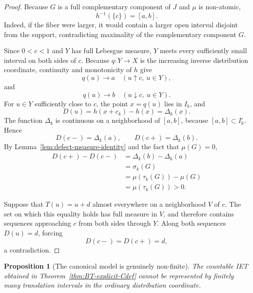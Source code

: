 \documentclass[11pt]{amsart}
\theoremstyle{plain}
\newtheorem{proposition}[theorem]{Proposition}
\theoremstyle{definition}
\theoremstyle{remark}
\begin{document}
\begin{proof}
Because \(G\) is a full complementary component of \(J\) and \(\mu\) is non-atomic,
\[
        h^{-1}(\{c\})=[a,b].
\]
Indeed, if the fiber were larger, it would contain a larger open interval disjoint from the
support, contradicting maximality of the complementary component \(G\).

Since \(0<c<1\) and \(Y\) has full Lebesgue measure, \(Y\) meets every sufficiently small
interval on both sides of \(c\). Because \(q:Y\to X\) is the increasing inverse
distribution coordinate, continuity and monotonicity of \(h\) give
\[
        q(u)\longrightarrow a
        \quad(u\uparrow c,\ u\in Y),
\]
and
\[
        q(u)\longrightarrow b
        \quad(u\downarrow c,\ u\in Y).
\]
For \(u\in Y\) sufficiently close to \(c\), the point \(x=q(u)\) lies in \(I_k\), and
\[
        D(u)=h(x+c_k)-h(x)=\Delta_k(x).
\]
The function \(\Delta_k\) is continuous on a neighborhood of \([a,b]\), because
\([a,b]\subset I_k^\circ\). Hence
\[
        D(c-)=\Delta_k(a),
        \qquad
        D(c+)=\Delta_k(b).
\]
By Lemma~\ref{lem:defect-measure-identity} and the fact that \(\mu(G)=0\),
\[
\begin{aligned}
D(c+)-D(c-)
&=
\Delta_k(b)-\Delta_k(a)\\
&=
\sigma_k(G)\\
&=
\mu(\tau_k(G))-\mu(G)\\
&=
\mu(\tau_k(G))
>0.
\end{aligned}
\]

Suppose that \(T(u)=u+d\) almost everywhere on a neighborhood \(V\) of \(c\). The set on
which this equality holds has full measure in \(V\), and therefore contains sequences
approaching \(c\) from both sides through \(Y\). Along both sequences \(D(u)=d\), forcing
\[
        D(c-)=D(c+)=d,
\]
a contradiction.
\end{proof}

\begin{proposition}[The canonical model is genuinely non-finite]
\label{prop:BT-nonfinite-canonical}
The countable IET obtained in Theorem~\ref{thm:BT-explicit-Cdef} cannot be
represented by finitely many translation intervals in the ordinary distribution coordinate.
\end{proposition}
\end{document}
